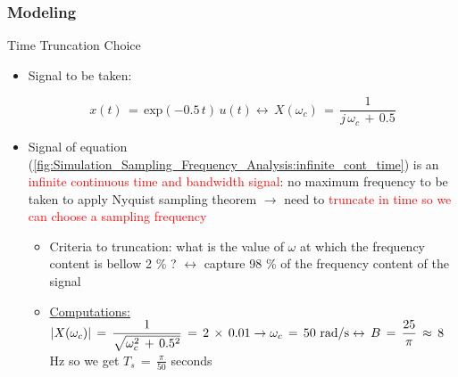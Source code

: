 \documentclass{beamer}
\begin{document}
\subsubsection{Modeling}
\begin{frame}[t,allowframebreaks]{Time Truncation Choice}

\begin{itemize}


\item Signal to be taken:

\begin{equation}
x(t) \, = \, \text{exp}(-0.5 \, t) \, u(t) \leftrightarrow \, X(\omega_c) \, = \, \displaystyle\frac{1}{j \, \omega_c\, + \, 0.5}
\label{fig:Simulation_Sampling_Frequency_Analysis:infinite_cont_time}
\end{equation}

\item Signal of equation (\autoref{fig:Simulation_Sampling_Frequency_Analysis:infinite_cont_time})  is an \textcolor{red}{infinite continuous time and bandwidth signal}: no maximum frequency to be taken to apply Nyquist sampling theorem $\rightarrow$ need to \textcolor{red}{truncate in time so we can choose a sampling frequency}

	\begin{itemize}
	\item Criteria to truncation: what is the value of $\omega$ at which the frequency content is bellow 2 \% ? $\leftrightarrow$ capture 98 \% of the frequency content of the signal
	
	\item \underline{Computations:} $ \displaystyle\left\lvert X(\omega_c) \displaystyle\right\rvert \, = \, \displaystyle\frac{1}{\sqrt{ \omega^2_c\, + \, 0.5^2} } \, = \, 2 \, \times \, 0.01  \rightarrow \omega_c \, = \, 50 \text{ rad/s} \leftrightarrow \, B \, = \,  \displaystyle\frac{25}{\pi} \, \approx \, 8$ Hz so we get $T_s \, = \, \displaystyle\frac{\pi}{50}$ seconds
	\end{itemize}

\end{itemize}

\end{frame}
\end{document}
